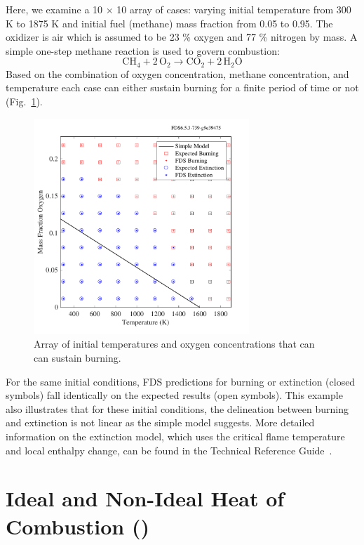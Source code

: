 \documentclass[11pt]{book}
\begin{document}
Here, we examine a 10 $\times$ 10 array of cases: varying initial temperature from 300 K to 1875 K and initial fuel (methane) mass fraction from 0.05 to 0.95. The oxidizer is air which is assumed to be 23 \% oxygen  and 77 \% nitrogen by mass. A simple one-step methane reaction is used to govern combustion:
\begin{equation}\label{eq:methane_ex}
\mathrm{CH_4 + 2\, O_2 \rightarrow  CO_2 + 2\, H_2O}
\end{equation}
Based on the combination of oxygen concentration, methane concentration, and temperature each case can either sustain burning for a finite period of time or not (Fig.~\ref{fig:extinct}).
\begin{figure}[h!]
\begin{center}
\includegraphics[height=3.2in]{SCRIPT_FIGURES/extinction}
\end{center}
\caption[ model test cases]{Array of initial temperatures and oxygen concentrations that can can sustain burning.}
\label{fig:extinct}
\end{figure}
For the same initial conditions, FDS predictions for burning or extinction (closed symbols) fall identically on the expected results (open symbols). This example also illustrates that for these initial conditions, the delineation between burning and extinction is not linear as the simple model suggests. More detailed information on the extinction model, which uses the critical flame temperature and local enthalpy change, can be found in the Technical Reference Guide~\cite{FDS_Tech_Guide}.

\clearpage

\section{Ideal and Non-Ideal Heat of Combustion ()}
\label{HoC}
\end{document}
